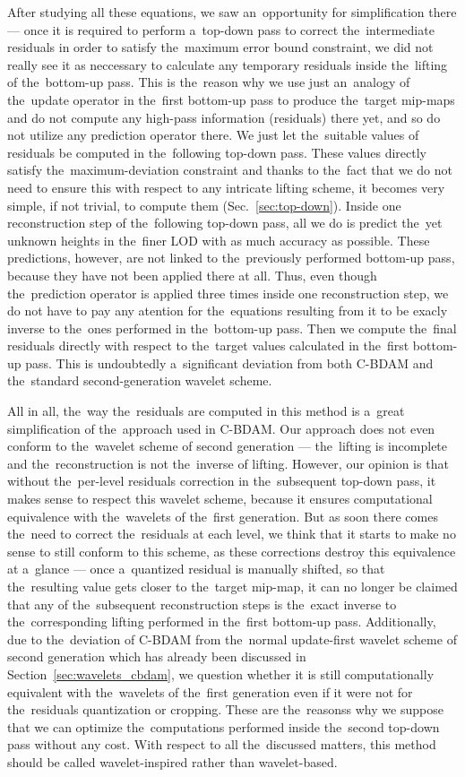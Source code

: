 After studying all these equations, we saw an~opportunity for simplification there --- once it is required to perform a~top-down pass to correct the~intermediate residuals in order to satisfy the~maximum error bound constraint, we did not really see it as neccessary to calculate any temporary residuals inside the~lifting of the~bottom-up pass. This is the~reason why we use just an~analogy of the~update operator in the~first bottom-up pass to produce the~target mip-maps and do not compute any high-pass information (residuals) there yet, and so do not utilize any prediction operator there. We just let the~suitable values of residuals be computed in the~following top-down pass. These values directly satisfy the~maximum-deviation constraint and thanks to the~fact that we do not need to ensure this with respect to any intricate lifting scheme, it becomes very simple, if not trivial, to compute them (Sec.~\ref{sec:top-down}). Inside one reconstruction step of the~following top-down pass, all we do is predict the~yet unknown heights in the~finer LOD with as much accuracy as possible. These predictions, however, are not linked to the~previously performed bottom-up pass, because they have not been applied there at all. Thus, even though the~prediction operator is applied three times inside one reconstruction step, we do not have to pay any atention for the~equations resulting from it to be exacly inverse to the~ones performed in the~bottom-up pass. Then we compute the~final residuals directly with respect to the~target values calculated in the~first bottom-up pass. This is undoubtedly a~significant deviation from both C-BDAM and the~standard second-generation wavelet scheme. 

All in all, the~way the~residuals are computed in this method is a~great simplification of the~approach used in C-BDAM. Our approach does not even conform to the~wavelet scheme of second generation --- the~lifting is incomplete and the~reconstruction is not the~inverse of lifting. However, our opinion is that without the~per-level residuals correction in the~subsequent top-down pass, it makes sense to respect this wavelet scheme, because it ensures computational equivalence with the~wavelets of the~first generation. But as soon there comes the~need to correct the~residuals at each level, we think that it starts to make no sense to still conform to this scheme, as these corrections destroy this equivalence at a~glance --- once a~quantized residual is manually shifted, so that the~resulting value gets closer to the~target mip-map, it can no longer be claimed that any of the~subsequent reconstruction steps is the~exact inverse to the~corresponding lifting performed in the~first bottom-up pass. Additionally, due to the~deviation of C-BDAM from the~normal update-first wavelet scheme of second generation which has already been discussed in Section~\ref{sec:wavelets_cbdam}, we question whether it is still computationally equivalent with the~wavelets of the~first generation even if it were not for the~residuals quantization or cropping. These are the~reasonss why we suppose that we can optimize the~computations performed inside the~second top-down pass without any cost. With respect to all the~discussed matters, this method should be called wavelet-inspired rather than wavelet-based.